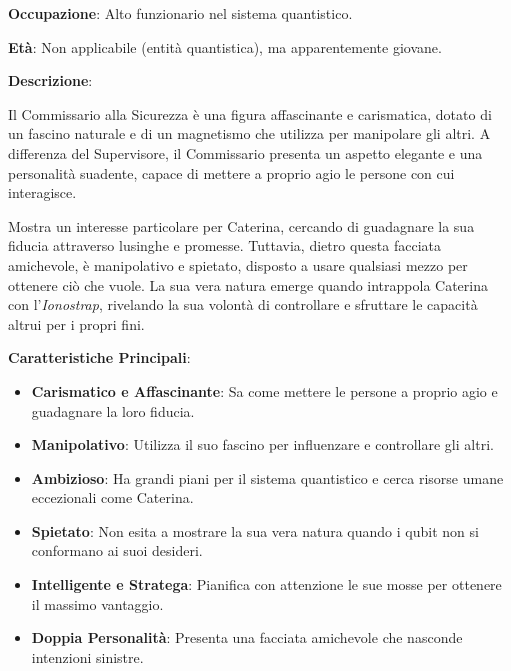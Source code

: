 \begin{tcolorbox}[colback=white,colframe=black,title=\textbf{Commissario alla Sicurezza}]
\begin{multicols}{2}
\textbf{Occupazione}: Alto funzionario nel sistema quantistico.

\textbf{Età}: Non applicabile (entità quantistica), ma apparentemente giovane. 

\textbf{Descrizione}:

Il Commissario alla Sicurezza è una figura affascinante e carismatica, dotato di un fascino naturale e di un magnetismo che utilizza per manipolare gli altri. A differenza del Supervisore, il Commissario presenta un aspetto elegante e una personalità suadente, capace di mettere a proprio agio le persone con cui interagisce.

Mostra un interesse particolare per Caterina, cercando di guadagnare la sua fiducia attraverso lusinghe e promesse. Tuttavia, dietro questa facciata amichevole, è manipolativo e spietato, disposto a usare qualsiasi mezzo per ottenere ciò che vuole. La sua vera natura emerge quando intrappola Caterina con l'\emph{Ionostrap}, rivelando la sua volontà di controllare e sfruttare le capacità altrui per i propri fini.

\textbf{Caratteristiche Principali}:
\begin{itemize}
    \item \textbf{Carismatico e Affascinante}: Sa come mettere le persone a proprio agio e guadagnare la loro fiducia.
    \item \textbf{Manipolativo}: Utilizza il suo fascino per influenzare e controllare gli altri.
    \item \textbf{Ambizioso}: Ha grandi piani per il sistema quantistico e cerca risorse umane eccezionali come Caterina.
    \item \textbf{Spietato}: Non esita a mostrare la sua vera natura quando i qubit non si conformano ai suoi desideri.
    \item \textbf{Intelligente e Stratega}: Pianifica con attenzione le sue mosse per ottenere il massimo vantaggio.
    \item \textbf{Doppia Personalità}: Presenta una facciata amichevole che nasconde intenzioni sinistre.
\end{itemize}
\end{multicols}
\end{tcolorbox}

\vspace{0.5cm}

\vspace{0.5cm}

